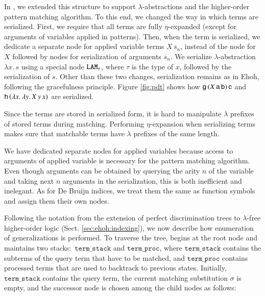 In \ehohii{}, we extended this structure to support $\lambda$-abstractions and
the higher-order pattern matching algorithm.
To this end, we changed the way in which terms are
serialized. First, we require that all terms are fully $\eta$-expanded (except
for arguments of variables applied in patterns). Then, when the term is serialized,
we dedicate a separate node for applied variable terms $X \, \overline{s}_n$,
instead of the node for $X$ followed by nodes for serialization of arguments
$\overline{s}_n$. We serialize $\lambda$-abstraction $\lambda x.\, s$ using
a special node $\texttt{LAM}_\tau$, where $\tau$ is the type of $x$,
followed by the serialization of $s$. Other than these two changes, serialization
remains as in Ehoh, following the gracefulness principle.
Figure \ref{fig:pdt} shows how $\mathsf{g} \,
(X\,\mathsf{a}\,\mathsf{b}) \, \mathsf{c}$ and $\mathsf{h} \, (\lambda x. \, \lambda y. \, X
\, y \, x)$ are serialized.

Since the terms are stored in serialized form, it is hard to manipulate
$\lambda$ prefixes of stored terms during matching. Performing $\eta$-expansion
when serializing terms makes sure that matchable terms have
$\lambda$ prefixes of the same length.

We have dedicated separate nodes for applied variables because access to arguments
of applied variable is necessary for the pattern matching algorithm. Even though
arguments can be obtained by querying the arity $n$ of the variable and taking
next $n$ arguments in the serialization, this is both inefficient and inelegant.
As for De Bruijn indices, we treat them the same as function symbols and assign
them their own nodes.

\newcommand{\tstack}{\ensuremath{\texttt{term\_stack}}}
\newcommand{\tproc}{\ensuremath{\texttt{term\_proc}}}

Following the notation from the extension of perfect discrimination trees to
$\lambda$-free higher-order logic (Sect. \ref{sec:ehoh:indexing}), we now describe how enumeration of
generalizations is performed. To traverse the tree, \ehohii{} begins at the root
node and maintains two stacks:\ \tstack{} and \tproc{}, where \tstack{} contains the
subterms of the query term that have to be matched, and \tproc{} contains
processed terms that are used to backtrack to previous states. Initially,
\tstack{} contains the query term, the current matching substitution
$\sigma$ is empty, and the successor node is chosen among the child nodes as
follows:

